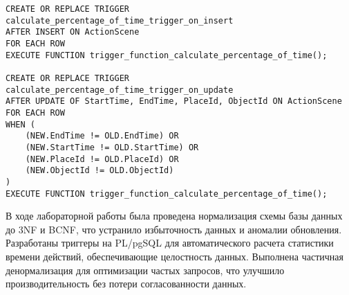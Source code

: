 \newpage
\begin{lstlisting}
CREATE OR REPLACE TRIGGER calculate_percentage_of_time_trigger_on_insert
AFTER INSERT ON ActionScene
FOR EACH ROW
EXECUTE FUNCTION trigger_function_calculate_percentage_of_time();

CREATE OR REPLACE TRIGGER calculate_percentage_of_time_trigger_on_update
AFTER UPDATE OF StartTime, EndTime, PlaceId, ObjectId ON ActionScene
FOR EACH ROW 
WHEN (
    (NEW.EndTime != OLD.EndTime) OR 
    (NEW.StartTime != OLD.StartTime) OR 
    (NEW.PlaceId != OLD.PlaceId) OR 
    (NEW.ObjectId != OLD.ObjectId)
)
EXECUTE FUNCTION trigger_function_calculate_percentage_of_time();
\end{lstlisting}

В ходе лабораторной работы была проведена нормализация схемы базы данных до 3NF и BCNF, что устранило избыточность данных и аномалии обновления. Разработаны триггеры на PL/pgSQL для автоматического расчета статистики времени действий, обеспечивающие целостность данных. Выполнена частичная денормализация для оптимизации частых запросов, что улучшило производительность без потери согласованности данных.

